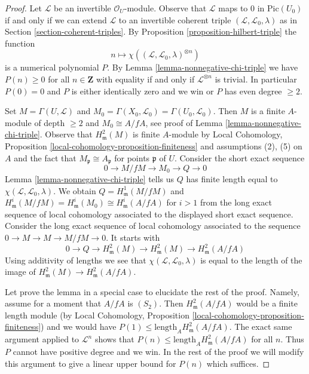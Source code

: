 \begin{proof}
Let $\mathcal{L}$ be an invertible $\mathcal{O}_U$-module.
Observe that $\mathcal{L}$ maps to $0$ in $\text{Pic}(U_0)$
if and only if we can extend $\mathcal{L}$ to an invertible
coherent triple $(\mathcal{L}, \mathcal{L}_0, \lambda)$
as in Section \ref{section-coherent-triples}.
By Proposition \ref{proposition-hilbert-triple}
the function
$$
n \longmapsto \chi((\mathcal{L}, \mathcal{L}_0, \lambda)^{\otimes n})
$$
is a numerical polynomial $P$. By Lemma \ref{lemma-nonnegative-chi-triple}
we have
$P(n) \geq 0$ for all $n \in \mathbf{Z}$ with equality if and only if
$\mathcal{L}^{\otimes n}$ is trivial. In particular $P(0) = 0$
and $P$ is either identically zero and we win or $P$ has even degree $\geq 2$.

\medskip\noindent
Set $M = \Gamma(U, \mathcal{L})$ and
$M_0 = \Gamma(X_0, \mathcal{L}_0) = \Gamma(U_0, \mathcal{L}_0)$.
Then $M$ is a finite $A$-module of depth $\geq 2$
and $M_0 \cong A/fA$, see proof of Lemma \ref{lemma-nonnegative-chi-triple}.
Observe that $H^2_\mathfrak m(M)$ is finite $A$-module by
Local Cohomology, Proposition \ref{local-cohomology-proposition-finiteness}
and assumptions (2), (5) on $A$ and the fact that
$M_\mathfrak p \cong A_\mathfrak p$
for points $\mathfrak p$ of $U$.
Consider the short exact sequence
$$
0 \to M/fM \to M_0 \to Q \to 0
$$
Lemma \ref{lemma-nonnegative-chi-triple} tells us $Q$ has finite length
equal to $\chi(\mathcal{L}, \mathcal{L}_0, \lambda)$.
We obtain $Q = H^1_\mathfrak m(M/fM)$ and
$H^i_\mathfrak m(M/fM) = H^i_\mathfrak m(M_0) \cong H^i_\mathfrak m(A/fA)$
for $i > 1$ from the long exact sequence of local cohomology
associated to the displayed short exact sequence. Consider the long
exact sequence of local cohomology associated to the sequence
$0 \to M \to M \to M/fM \to 0$. It starts with
$$
0 \to Q \to H^2_\mathfrak m(M) \to H^2_\mathfrak m(M) \to
H^2_\mathfrak m(A/fA)
$$
Using additivity of lengths we see that
$\chi(\mathcal{L}, \mathcal{L}_0, \lambda)$
is equal to the length of the image of
$H^2_\mathfrak m(M) \to H^2_\mathfrak m(A/fA)$.

\medskip\noindent
Let prove the lemma in a special case to elucidate the rest of the proof.
Namely, assume for a moment that $A/fA$ is $(S_2)$.
Then $H^2_\mathfrak m(A/fA)$ would be a finite length module
(by Local Cohomology, Proposition \ref{local-cohomology-proposition-finiteness})
and we would have $P(1) \leq \text{length}_A H^2_\mathfrak m(A/fA)$.
The exact same argument applied to $\mathcal{L}^n$ shows that
$P(n) \leq \text{length}_A H^2_\mathfrak m(A/fA)$ for all $n$.
Thus $P$ cannot have positive degree and we win.
In the rest of the proof we will modify this argument to give
a linear upper bound for $P(n)$ which suffices.


\end{proof}

